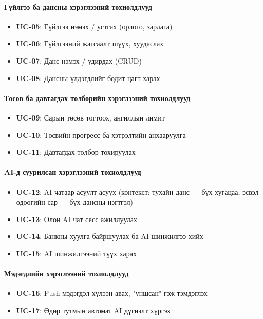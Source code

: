 \paragraph{Гүйлгээ ба дансны хэрэглээний тохиолдлууд}
\begin{itemize}
    \item \textbf{UC-05}: Гүйлгээ нэмэх / устгах (орлого, зарлага)
    \item \textbf{UC-06}: Гүйлгээний жагсаалт шүүх, хуудаслах
    \item \textbf{UC-07}: Данс нэмэх / удирдах (CRUD)
    \item \textbf{UC-08}: Дансны үлдэгдлийг бодит цагт харах
\end{itemize}

\paragraph{Төсөв ба давтагдах төлбөрийн хэрэглээний тохиолдлууд}
\begin{itemize}
    \item \textbf{UC-09}: Сарын төсөв тогтоох, ангиллын лимит
    \item \textbf{UC-10}: Төсвийн прогресс ба хэтрэлтийн анхааруулга
    \item \textbf{UC-11}: Давтагдах төлбөр тохируулах
\end{itemize}

\paragraph{AI-д суурилсан хэрэглээний тохиолдлууд}
\begin{itemize}
    \item \textbf{UC-12}: AI чатаар асуулт асуух (контекст: тухайн данс --- бүх хугацаа, эсвэл одоогийн сар --- бүх дансны нэгтгэл)
    \item \textbf{UC-13}: Олон AI чат сесс ажиллуулах
    \item \textbf{UC-14}: Банкны хуулга байршуулах ба AI шинжилгээ хийх
    \item \textbf{UC-15}: AI шинжилгээний түүх харах
\end{itemize}

\paragraph{Мэдэгдлийн хэрэглээний тохиолдлууд}
\begin{itemize}
    \item \textbf{UC-16}: Push мэдэгдэл хүлээн авах, "уншсан" гэж тэмдэглэх
    \item \textbf{UC-17}: Өдөр тутмын автомат AI дүгнэлт хүргэх
\end{itemize}

